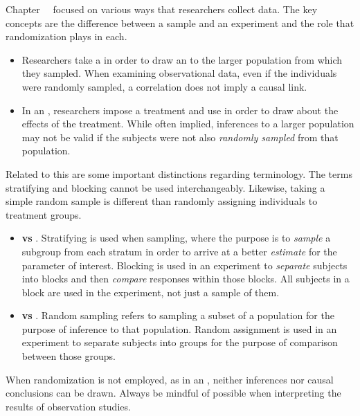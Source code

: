 Chapter~\thechapter~ focused on various ways that researchers collect data.  The key concepts are the difference between a sample and an experiment and the role that randomization plays in each.
\begin{itemize}
\item Researchers take a  in order to draw an  to the larger population from which they sampled.  When examining observational data, even if the individuals were randomly sampled, a correlation does not imply a causal link.  
\item In an , researchers impose a treatment and use  in order to draw  about the effects of the treatment.  While often implied, inferences to a larger population may not be valid if the subjects were not also \textit{randomly sampled} from that population.

\end{itemize}
Related to this are some important distinctions regarding terminology.  The terms stratifying and blocking cannot be used interchangeably.  Likewise, taking a simple random sample is different than randomly assigning individuals to treatment groups.  
\begin{itemize}
\item \textbf{ vs }.  Stratifying is used when sampling, where the purpose is to \emph{sample} a subgroup from each stratum in order to arrive at a better \textit{estimate} for the parameter of interest.  Blocking is used in an experiment to \emph{separate} subjects into blocks and then \emph{compare} responses within those blocks.  All subjects in a block are used in the experiment, not just a sample of them.
\item \textbf{ vs }.  Random sampling refers to sampling a subset of a population for the purpose of inference to that population.  Random assignment is used in an experiment to separate subjects into groups for the purpose of comparison between those groups.  
\end{itemize}  
When randomization is not employed, as in an , neither inferences nor causal conclusions can be drawn.  Always be mindful of possible  when interpreting the results of observation studies.



